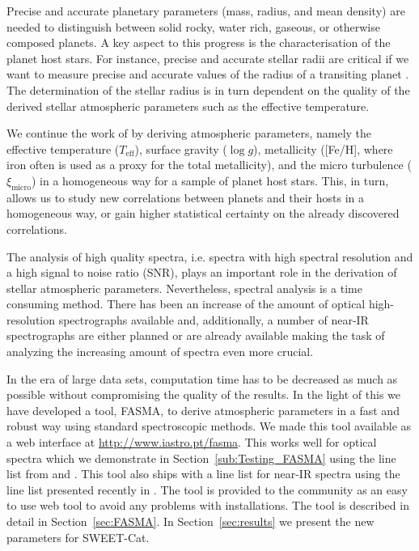\documentclass{aa}
\begin{document}
Precise and accurate planetary parameters (mass, radius, and mean density) are
needed to distinguish between solid rocky, water rich, gaseous, or otherwise
composed planets. A key aspect to this progress is the characterisation of the
planet host stars. For instance, precise and accurate stellar radii are critical
if we want to measure precise and accurate values of the radius of a transiting
planet \citep[see e.g.][]{Torres2012,Mortier2013}. The determination of the
stellar radius is in turn dependent on the quality of the derived stellar
atmospheric parameters such as the effective temperature.

We continue the work of \citet{Santos13} by deriving atmospheric parameters,
namely the effective temperature ($T_\mathrm{eff}$), surface gravity ($\log g$),
metallicity ([Fe/H], where iron often is used as a proxy for the total
metallicity), and the micro turbulence ($\xi_\mathrm{micro}$) in a homogeneous
way for a sample of planet host stars. This, in turn, allows us to study new
correlations between planets and their hosts in a homogeneous way,  or gain
higher statistical certainty on the already discovered correlations.

The analysis of high quality spectra, i.e. spectra with high spectral resolution
and a high signal to noise ratio (SNR), plays an important role in the
derivation of stellar atmospheric parameters. Nevertheless, spectral analysis is
a time consuming method. There has been an increase of the amount of  optical
high-resolution spectrographs available and, additionally, a number of near-IR
spectrographs are either planned or are already available making the task of
analyzing the increasing amount of spectra even more crucial.

In the era of large data sets, computation time has to be decreased as much as
possible without compromising the quality of the results. In the light of this
we have developed a tool, FASMA, to derive atmospheric parameters in a fast and
robust way using standard spectroscopic methods. We made this tool available as
a web interface at \url{http://www.iastro.pt/fasma}. This works well for optical
spectra which we demonstrate in Section~\ref{sub:Testing_FASMA} using the line
list from \citet{Sousa2008a} and \citet{Tsantaki2013}. This tool also ships with
a line list for near-IR spectra using the line list presented recently in
\citet{Andreasen2016}. The tool is provided to the community as an easy to use
web tool to avoid any problems with installations. The tool is described in
detail in Section~\ref{sec:FASMA}. In Section~\ref{sec:results} we present the
new parameters for SWEET-Cat.
\end{document}
